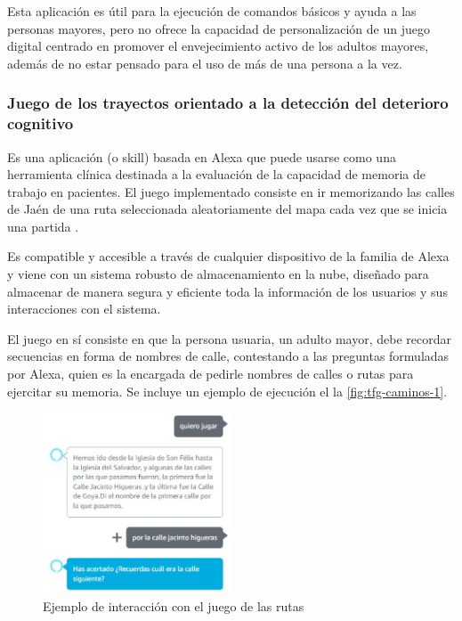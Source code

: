 Esta aplicación es útil para la ejecución de comandos básicos y ayuda a las personas mayores, pero no ofrece la capacidad de personalización de un juego digital centrado en promover el envejecimiento activo de los adultos mayores, además de no estar pensado para el uso de más de una persona a la vez.

\subsubsection{Juego de los trayectos orientado a la detección del deterioro cognitivo}

Es una aplicación (o skill) basada en Alexa que puede usarse como una herramienta clínica destinada a la evaluación de la capacidad de memoria de trabajo en pacientes. El juego implementado consiste en ir memorizando las calles de Jaén de una ruta seleccionada aleatoriamente del mapa cada vez que se inicia una partida \parencite{tfgAlexa3}.

Es compatible y accesible a través de cualquier dispositivo de la familia de Alexa y viene con un sistema robusto de almacenamiento en la nube, diseñado para almacenar de manera segura y eficiente toda la información de los usuarios y sus interacciones con el sistema.

El juego en sí consiste en que la persona usuaria, un adulto mayor, debe recordar secuencias en forma de nombres de calle, contestando a las preguntas formuladas por Alexa, quien es la encargada de pedirle nombres de calles o rutas para ejercitar su memoria. Se incluye un ejemplo de ejecución el la \autoref{fig:tfg-caminos-1}.

\begin{figure}[H]
	\centering
	\includegraphics[width=0.5\textwidth]{imgs/tfg-caminos-1.JPG}
	\caption{Ejemplo de interacción con el juego de las rutas}
	\label{fig:tfg-caminos-1}
\end{figure}

